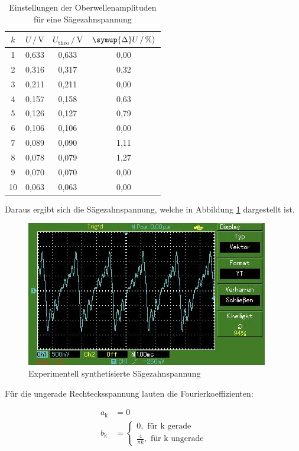 \begin{table}[H]
    \centering
    \caption{Einstellungen der Oberwellenamplituden für eine Sägezahnspannung}
    \label{tab:Messdaten4}
    \begin{tabular}{c c c c}
    \toprule
    $k$ & $U \,/\, \si{\volt}$ & $U_\text{theo} \,/\, \si{\volt}$ & $\symup{\Delta}U \,/\, \si{\percent})$ \\
    \midrule
    1 & 0,633 & 0,633 & 0,00 \\
    2 & 0,316 & 0,317 & 0,32 \\
    3 & 0,211 & 0,211 & 0,00 \\
    4 & 0,157 & 0,158 & 0,63 \\
    5 & 0,126 & 0,127 & 0,79 \\
    6 & 0,106 & 0,106 & 0,00 \\
    7 & 0,089 & 0,090 & 1,11 \\
    8 & 0,078 & 0,079 & 1,27 \\
    9 & 0,070 & 0,070 & 0,00 \\
   10 & 0,063 & 0,063 & 0,00 \\
    \bottomrule
    \end{tabular}
\end{table}

Daraus ergibt sich die Sägezahnspannung, welche in Abbildung \ref{fig:Ex1}
dargestellt ist.

\begin{figure}[H]
    \centering
    \includegraphics[scale = 0.7]{content/saege.jpg}
    \caption{Experimentell synthetisierte Sägezahnspannung}
    \label{fig:Ex1}
\end{figure}

Für die ungerade Rechtecksspannung lauten die Fourierkoeffizienten:

\begin{align*}
    a_\text{k} &= 0 \\
    b_\text{k} &= 
        \begin{cases} 
            0, \text{ für k gerade} \\ \frac{4}{\pi k}, \text{ für k ungerade}
        \end{cases}
\end{align*}

